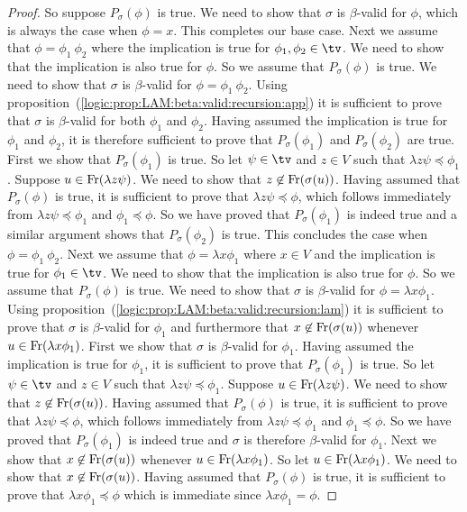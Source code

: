 \begin{proof}
    So suppose $P_{\sigma}(\phi)$ is true. We need to show that $\sigma$ is 
    $\beta$-valid for $\phi$, which is always the case when $\phi=x$. This 
    completes our base case.
    Next we assume that $\phi=\phi_{1}\ \phi_{2}$ where the implication is true
    for $\phi_{1},\phi_{2}\in\tv$. We need to show that the implication is also 
    true for $\phi$. So we assume that $P_{\sigma}(\phi)$ is true. We need to 
    show that $\sigma$ is $\beta$-valid for $\phi=\phi_{1}\ \phi_{2}$. Using
    proposition~(\ref{logic:prop:LAM:beta:valid:recursion:app}) it is 
    sufficient to prove that $\sigma$ is $\beta$-valid for both $\phi_{1}$
    and $\phi_{2}$. Having assumed the implication is true for $\phi_{1}$
    and $\phi_{2}$, it is therefore sufficient to prove that 
    $P_{\sigma}(\phi_{1})$ and $P_{\sigma}(\phi_{2})$ are true. First we 
    show that $P_{\sigma}(\phi_{1})$ is true. So let $\psi\in\tv$ and 
    $z\in V$ such that $\lambda z\psi\preceq\phi_{1}$. Suppose
    $u\in\mbox{\rm Fr}(\lambda z\psi)$. We need to show that $z\not\in\mbox{\rm Fr}(\sigma(u))$.
    Having assumed that $P_{\sigma}(\phi)$ is true, it is sufficient to prove
    that $\lambda z\psi\preceq\phi$, which follows immediately from 
    $\lambda z\psi\preceq\phi_{1}$ and $\phi_{1}\preceq\phi$. So we have proved
    that $P_{\sigma}(\phi_{1})$ is indeed true and a similar argument shows that
    $P_{\sigma}(\phi_{2})$ is true. This concludes the case when $\phi=\phi_{1}\
    \phi_{2}$. Next we assume that $\phi=\lambda x\phi_{1}$ where $x\in V$ and 
    the implication is true for $\phi_{1}\in\tv$. We need to show that the 
    implication is also true for $\phi$. So we assume that $P_{\sigma}(\phi)$
    is true. We need to show that $\sigma$ is $\beta$-valid for $\phi=
    \lambda x\phi_{1}$. Using 
    proposition~(\ref{logic:prop:LAM:beta:valid:recursion:lam}) it is sufficient
    to prove that $\sigma$ is $\beta$-valid for $\phi_{1}$ and furthermore that
    $x\not\in\mbox{\rm Fr}(\sigma(u))$ whenever $u\in\mbox{\rm Fr}(\lambda x\phi_{1})$. First
    we show that $\sigma$ is $\beta$-valid for $\phi_{1}$. Having assumed the
    implication is true for $\phi_{1}$, it is sufficient to prove that 
    $P_{\sigma}(\phi_{1})$ is true. So let $\psi\in\tv$ and $z\in V$ such that
    $\lambda z\psi\preceq\phi_{1}$. Suppose $u\in\mbox{\rm Fr}(\lambda z\psi)$. We 
    need to show that $z\not\in\mbox{\rm Fr}(\sigma(u))$. Having assumed that
    $P_{\sigma}(\phi)$ is true, it is sufficient to prove that $\lambda z\psi
    \preceq\phi$, which follows immediately from $\lambda z\psi\preceq\phi_{1}$
    and $\phi_{1}\preceq\phi$. So we have proved that $P_{\sigma}(\phi_{1})$ is
    indeed true and $\sigma$ is therefore $\beta$-valid for $\phi_{1}$.
    Next we show that $x\not\in\mbox{\rm Fr}(\sigma(u))$ whenever $u\in\mbox{\rm Fr}(\lambda
    x\phi_{1})$. So let $u\in\mbox{\rm Fr}(\lambda x\phi_{1})$. We need to show that 
    $x\not\in\mbox{\rm Fr}(\sigma(u))$. Having assumed that $P_{\sigma}(\phi)$ is 
    true, it is sufficient to prove that $\lambda x\phi_{1}\preceq\phi$ which
    is immediate since $\lambda x\phi_{1}=\phi$.
\end{proof}

